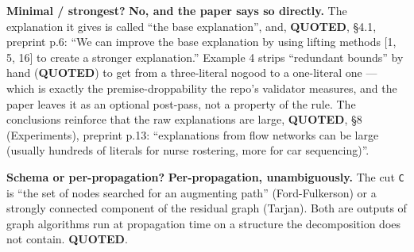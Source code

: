 \documentclass[10pt,a4paper]{article}
\newcommand{\provtag}[2]{{\small\sffamily\bfseries\textcolor{#1}{#2}}}
\newenvironment{pubblock}{%
  \par\smallskip
  \def\FrameCommand{\textcolor{litbar}{\vrule width 2.5pt}\hspace{9pt}}%
  \MakeFramed{\advance\hsize-\width\FrameRestore}}%
  {\endMakeFramed\par\smallskip}
\begin{document}
\begin{pubblock}
\textbf{Minimal / strongest?} \textbf{No, and the paper says so directly.} The explanation it gives is called ``the base explanation'', and, \provtag{tagquoted}{QUOTED}, \S{}4.1, preprint p.6: ``We can improve the base explanation by using lifting methods [1, 5, 16] to create a stronger explanation.'' Example 4 strips ``redundant bounds'' by hand (\provtag{tagquoted}{QUOTED}) to get from a three-literal nogood to a one-literal one --- which is exactly the premise-droppability the repo's validator measures, and the paper leaves it as an optional post-pass, not a property of the rule. The conclusions reinforce that the raw explanations are large, \provtag{tagquoted}{QUOTED}, \S{}8 (Experiments), preprint p.13: ``explanations from flow networks can be large (usually hundreds of literals for nurse rostering, more for car sequencing)''.

\textbf{Schema or per-propagation?} \textbf{Per-propagation, unambiguously.} The cut \texttt{C} is ``the set of nodes searched for an augmenting path'' (Ford-Fulkerson) or a strongly connected component of the residual graph (Tarjan). Both are outputs of graph algorithms run at propagation time on a structure the decomposition does not contain. \provtag{tagquoted}{QUOTED}.


\end{pubblock}
\end{document}
